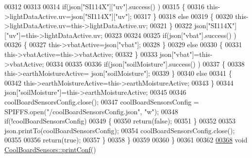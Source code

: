 \begin{DoxyCode}
00312 
00313             
00314             \textcolor{keywordflow}{if}(json[\textcolor{stringliteral}{"SI114X"}][\textcolor{stringliteral}{"uv"}].success() )         
00315             \{           
00316                 this->lightDataActive.uv=json[\textcolor{stringliteral}{"SI114X"}][\textcolor{stringliteral}{"uv"}];
00317             \}
00318             \textcolor{keywordflow}{else}
00319             \{
00320                 this->lightDataActive.uv=this->lightDataActive.uv;
00321             \}
00322             json[\textcolor{stringliteral}{"SI114X"}][\textcolor{stringliteral}{"uv"}]=this->lightDataActive.uv;
00323 
00324 
00325             \textcolor{keywordflow}{if}(json[\textcolor{stringliteral}{"vbat"}].success() )
00326             \{
00327                 this->vbatActive=json[\textcolor{stringliteral}{"vbat"}];
00328             \}
00329             \textcolor{keywordflow}{else}
00330             \{
00331                 this->vbatActive=this->vbatActive;
00332             \}
00333             json[\textcolor{stringliteral}{"vbat"}]=this->vbatActive;
00334 
00335             
00336             \textcolor{keywordflow}{if}(json[\textcolor{stringliteral}{"soilMoisture"}].success() )
00337             \{           
00338                 this->earthMoistureActive= json[\textcolor{stringliteral}{"soilMoisture"}];
00339             \}
00340             \textcolor{keywordflow}{else}
00341             \{
00342                 this->earthMoistureActive=this->earthMoistureActive;
00343             \}
00344             json[\textcolor{stringliteral}{"soilMoisture"}]=this->earthMoistureActive;
00345 
00346             coolBoardSensorsConfig.close();         
00347             coolBoardSensorsConfig = SPIFFS.open(\textcolor{stringliteral}{"/coolBoardSensorsConfig.json"}, \textcolor{stringliteral}{"w"});          
00348             \textcolor{keywordflow}{if}(!coolBoardSensorsConfig)
00349             \{
00350                 \textcolor{keywordflow}{return}(\textcolor{keyword}{false});          
00351             \}  
00352 
00353             json.printTo(coolBoardSensorsConfig);
00354             coolBoardSensorsConfig.close();         
00355             
00356               \textcolor{keywordflow}{return}(\textcolor{keyword}{true}); 
00357         \}
00358     \}   
00359 
00360 \}
00361 
00362 
\hyperlink{class_cool_board_sensors_af6fd79505815b204c178617ecf54c873}{00368} \textcolor{keywordtype}{void} \hyperlink{class_cool_board_sensors_af6fd79505815b204c178617ecf54c873}{CoolBoardSensors::printConf}()

\end{DoxyCode}
